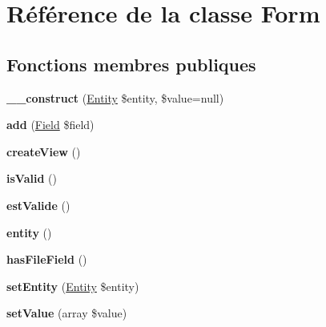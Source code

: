 \hypertarget{class_library_1_1_form}{\section{Référence de la classe Form}
\label{class_library_1_1_form}
}
\subsection*{Fonctions membres publiques}
\begin{DoxyCompactItemize}
\item 
\hypertarget{class_library_1_1_form_a8d1b8ac2541165e4ec6cab4c2010ad9b}{{\bfseries \+\_\+\+\_\+construct} (\hyperlink{class_library_1_1_entity}{Entity} \$entity, \$value=null)}\label{class_library_1_1_form_a8d1b8ac2541165e4ec6cab4c2010ad9b}

\item 
\hypertarget{class_library_1_1_form_a552a9da675cd30f41f641a5bc0fac1ed}{{\bfseries add} (\hyperlink{class_library_1_1_field}{Field} \$field)}\label{class_library_1_1_form_a552a9da675cd30f41f641a5bc0fac1ed}

\item 
\hypertarget{class_library_1_1_form_ac71cf617ff65c6fdca369fca18848a0d}{{\bfseries create\+View} ()}\label{class_library_1_1_form_ac71cf617ff65c6fdca369fca18848a0d}

\item 
\hypertarget{class_library_1_1_form_a7b37efab7473a1effc29f8be2421f6e3}{{\bfseries is\+Valid} ()}\label{class_library_1_1_form_a7b37efab7473a1effc29f8be2421f6e3}

\item 
\hypertarget{class_library_1_1_form_ad2696392106fc5da9c1ab0e5f8985531}{{\bfseries est\+Valide} ()}\label{class_library_1_1_form_ad2696392106fc5da9c1ab0e5f8985531}

\item 
\hypertarget{class_library_1_1_form_a8c152f6ef1c779ffd79d5c7ee4d37721}{{\bfseries entity} ()}\label{class_library_1_1_form_a8c152f6ef1c779ffd79d5c7ee4d37721}

\item 
\hypertarget{class_library_1_1_form_aa6ac839fa55f115892edd24c998c6ee1}{{\bfseries has\+File\+Field} ()}\label{class_library_1_1_form_aa6ac839fa55f115892edd24c998c6ee1}

\item 
\hypertarget{class_library_1_1_form_a1450c344b6b90437e1c69401aa618ad2}{{\bfseries set\+Entity} (\hyperlink{class_library_1_1_entity}{Entity} \$entity)}\label{class_library_1_1_form_a1450c344b6b90437e1c69401aa618ad2}

\item 
\hypertarget{class_library_1_1_form_a12d2e55d2474baad254bc219d2a3b206}{{\bfseries set\+Value} (array \$value)}\label{class_library_1_1_form_a12d2e55d2474baad254bc219d2a3b206}

\end{DoxyCompactItemize}
